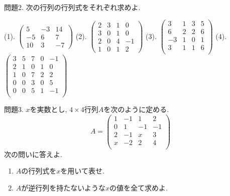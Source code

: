 \documentclass[dvipdfmx,a4paper,11pt]{article}
\theoremstyle{definition}
\begin{document}
 \vspace{5pt}
 問題2. 次の行列の行列式をそれぞれ求めよ. 
  
  (1). 
$
 \begin{pmatrix}
5 &-3&14\\
-5 & 6 & 7\\
10&3 &-7
 \end{pmatrix}
 $
   (2). 
$
 \begin{pmatrix}
2&3 &1&0\\
3&0 &1&0\\
2&0 & 4 & -1\\
1&0 &1 &2
 \end{pmatrix}
 $
 (3). 
 $
 \begin{pmatrix}
 3& 1& 3  & 5\\
 6& 2& 2  & 6\\
 -3& 1& 0 & 1\\
 3& 1& 1& 6\\
 \end{pmatrix}
 $ 
   (4). 
 $
 \begin{pmatrix}
  3& 5& 7& 0&-1\\
  2& 1& 0  & 1&0\\
  1& 0& 7 & 2&2\\
  0& 0& 3 & 0&5\\
  0& 0& 5& 1&-1\\
 \end{pmatrix}
 $
  
 \vspace{5pt}
 問題3. 
 $x$を実数とし, $4 \times 4$行列$A$を次のように定める.
 $$A=
  \begin{pmatrix}
1 &-1&1 &2\\
0 & 1&-1 &-1\\
2 &-1&x &3\\
x &-2&2&4\\
 \end{pmatrix}
 $$
次の問いに答えよ.
\begin{enumerate}
  \setlength{\parskip}{0cm} 
  \setlength{\itemsep}{0cm}
\item $A$の行列式を$x$を用いて表せ.
\item $A$が逆行列を持たないような$x$の値を全て求めよ.
\end{enumerate}
\end{document}
